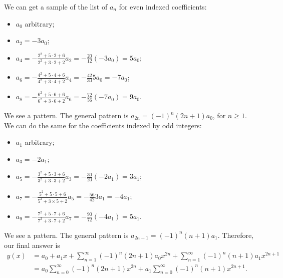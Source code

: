 \documentclass[12pt]{article}
\begin{document}
	We can get a sample of the list of $a_n$ for even indexed coefficients:
		\begin{itemize}
		\item $a_0$ arbitrary;
		\item $a_2 = -3 a_0$;
		\item $a_4 = - \frac{2^2 + 5 \cdot 2 + 6}{2^2 + 3 \cdot 2 + 2} a_2 = - \frac{20}{12} (-3 a_0) = 5 a_0$;
		\item $a_6 = - \frac{4^2 + 5 \cdot 4 + 6}{4^2 + 3 \cdot 4 + 2} a_4 = - \frac{42}{30} 5 a_0 = - 7 a_0$;
		\item $a_8 = - \frac{6^2 + 5 \cdot 6 + 6}{6^2 + 3 \cdot 6 + 2} a_6 = - \frac{72}{56} (-7 a_0) = 9 a_0$.
		\end{itemize}
	We see a pattern. The general pattern is $a_{2n} = (-1)^n (2n + 1) a_0$, for $n \geq 1$. We can do the same for the coefficients indexed by odd integers:
		\begin{itemize}
		\item $a_1$ arbitrary;
		\item $a_3 = -2a_1$;
		\item $a_5 = - \frac{3^2 + 5 \cdot 3 + 6}{3^2 + 3 \cdot 3 + 2} a_3 = - \frac{30}{20} (-2 a_1) = 3 a_1$;
		\item $a_7 = - \frac{5^2 + 5 \cdot 5 + 6}{5^2 + 3 \times 5 + 2} a_5 = - \frac{56}{42} 3 a_1 = -4 a_1$;
		\item $a_9 = - \frac{7^2 + 5 \cdot 7 + 6}{7^2 + 3 \cdot 7 + 2} a_7 = - \frac{90}{72} (-4 a_1) = 5 a_1$.
		\end{itemize}
	We see a pattern. The general pattern is $a_{2n + 1} = (-1)^n (n + 1) a_1$. Therefore, our final answer is
		\begin{align*}
		y(x) &= a_0 + a_1 x + \sum_{n = 1}^\infty (-1)^n (2n + 1) a_0 x^{2n} + \sum_{n = 1}^\infty (-1)^n (n + 1) a_1 x^{2n + 1} \\
		&= a_0 \sum_{n = 0}^\infty (-1)^n (2n + 1) x^{2n} + a_1 \sum_{n = 0}^\infty (-1)^n (n + 1) x^{2n + 1} .
		\end{align*}
		
\end{document}
